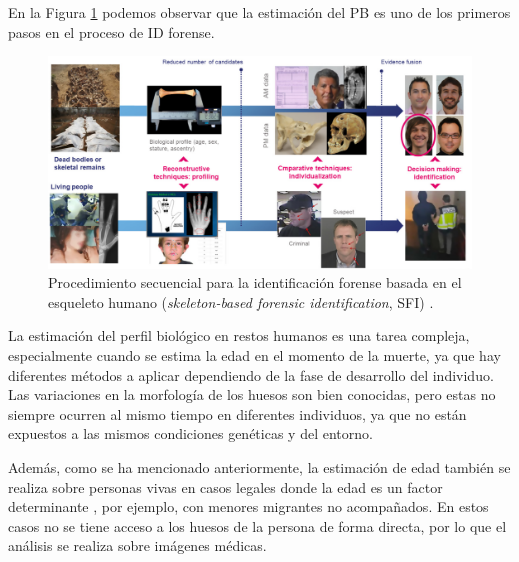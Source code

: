En la Figura \ref{fig:SFI_pipeline} podemos observar que la estimación del PB es uno de los primeros pasos en 
el proceso de ID forense. 

\begin{figure}[h]
    \centering
    \includegraphics[width=\textwidth]{capitulos/cap_01/imagenes/SFI_pipeline.png}
    \caption{Procedimiento secuencial para la identificación forense basada en el esqueleto humano 
            (\textit{skeleton-based forensic identification}, SFI) \cite{mesejo2020}.} 
    \label{fig:SFI_pipeline}
\end{figure}

La estimación del perfil biológico en restos humanos es una tarea compleja, especialmente cuando se estima la edad
en el momento de la muerte, ya que hay diferentes métodos a aplicar dependiendo de la fase de desarrollo del individuo. 
Las variaciones en la morfología de los huesos son bien conocidas, pero estas no siempre ocurren al mismo tiempo en 
diferentes individuos, ya que no están expuestos a las mismos condiciones genéticas y del entorno.

Además, como se ha mencionado anteriormente, la estimación de edad también se realiza sobre personas vivas
en casos legales donde la edad es un factor determinante \cite{schmeling2016}, por ejemplo, con menores migrantes  
no acompañados. En estos casos no se tiene acceso a 
los huesos de la persona de forma directa, por lo que el análisis se realiza sobre imágenes médicas.



